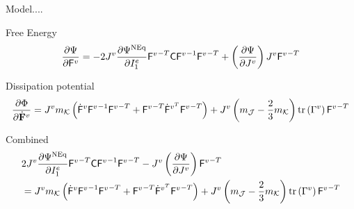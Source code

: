 \documentclass{beamer}
\def\myPhi{{\mathrm{\Phi}}}
\def\myPsi{{\mathrm{\Psi}}}
\def\myF{{\mathsf{F}}}
\def\myC{{\bf\mathsf{C}}}
\begin{document}
    \begin{frame}{Model....}
        \begin{block}{Free Energy}
            \footnotesize\begin{align*}
                \del{\myPsi}{\myF^v}=
                -2J^v \del{\myPsi^{\rm NEq}}{I^e_1}{\myF^v}^{-T}\myC{\myF^v}^{-1}{\myF^v}^{-T} +
                \left({\del{\myPsi}{J^v}}\right) J^v{\myF^v}^{-T}
            \end{align*}
        \end{block}
        \begin{block}{Dissipation potential}
            \footnotesize\begin{align*}
                \del{\myPhi}{\dot{\mathsf{\bf F}}^v}
            =
            J^vm_\mathcal{K}
            \left(
                \dot{\mathsf{F}}^v {\mathsf{F}^v}^{-1} {\mathsf{F}^v}^{-T}
                +
                {\mathsf{F}^v}^{-T} {\dot{\mathsf{F}}}^{v^T} {\mathsf{F}^v}^{-T}
            \right) +J^v
            \lr{m_\mathcal{J}
            - \frac{2}{3}m_\mathcal{K}
            }\text{tr}\lr{\Gamma^v}{\mathsf{F}^v}^{-T} 
            \end{align*}
        \end{block}
        \begin{block}{Combined}
            \footnotesize
            \begin{align*}
                & 2J^v \del{\myPsi^{\rm NEq}}{I^e_1}{\myF^v}^{-T}\myC{\myF^v}^{-1}{\myF^v}^{-T} -
                J^v\left({\del{\myPsi}{J^v}}\right) {\myF^v}^{-T}\\ & = J^vm_\mathcal{K}
                \left(
                    \dot{\mathsf{F}}^v {\mathsf{F}^v}^{-1} {\mathsf{F}^v}^{-T}
                    +
                    {\mathsf{F}^v}^{-T} {\dot{\mathsf{F}}}^{v^T} {\mathsf{F}^v}^{-T}
                \right)+J^v
                \lr{m_\mathcal{J}
                - \frac{2}{3}m_\mathcal{K}
                }\text{tr}\lr{\Gamma^v}{\mathsf{F}^v}^{-T}
            \end{align*}
        \end{block}
    \end{frame}
\end{document}
